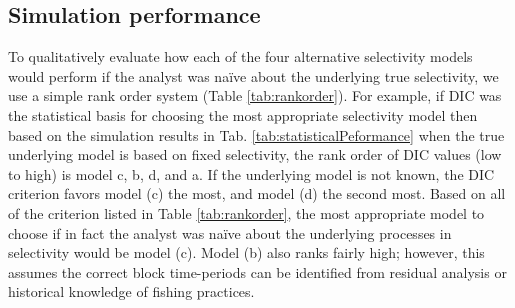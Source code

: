 

\subsection*{Simulation performance} %
\label{sub:simulation_performance}




To qualitatively evaluate how each of the four alternative selectivity models would perform if the analyst was na\"ive about the underlying true selectivity, we use a simple rank order system (Table \ref{tab:rankorder}).  For example, if DIC was the statistical basis for choosing the most appropriate selectivity model then based on the simulation results in Tab. \ref{tab:statisticalPeformance} when the true underlying model is based on fixed selectivity, the rank order of DIC values (low to high) is model c, b, d, and a. If the underlying model is not known, the DIC criterion favors model (c) the most, and model (d) the second most.    Based on all of the criterion listed in Table \ref{tab:rankorder}, the most appropriate model to choose if in fact the analyst was na\"ive about the underlying processes in selectivity would be model (c).    Model (b) also ranks fairly high; however, this assumes the correct block time-periods can be identified from residual analysis or historical knowledge of fishing practices.

